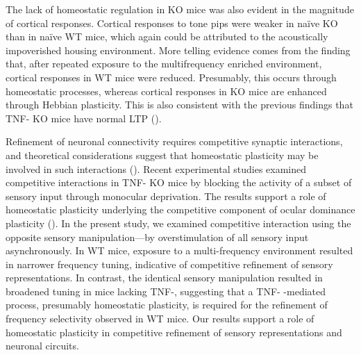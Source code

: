 The lack of homeostatic regulation in KO mice was also evident in the magnitude of cortical responses. Cortical responses to tone pips were weaker in na\"ive KO than in na\"ive WT mice, which again could be attributed to the acoustically impoverished housing environment. More telling evidence comes from the finding that, after repeated exposure to the multifrequency enriched environment, cortical responses in WT mice were reduced. Presumably, this occurs through homeostatic processes, whereas cortical responses in KO mice are enhanced through Hebbian plasticity. This is also consistent with the previous findings that TNF-\textalpha{} KO mice have normal LTP (\cite{Albensi2000, Stellwagen2006, Kaneko2008}).

Refinement of neuronal connectivity requires competitive synaptic interactions, and theoretical considerations suggest that homeostatic plasticity may be involved in such interactions (\cite{Davis2001, Burrone2003, Turrigiano2004}). Recent experimental studies examined competitive interactions in TNF-\textalpha{} KO mice by blocking the activity of a subset of sensory input through monocular deprivation. The results support a role of homeostatic plasticity underlying the competitive component of ocular dominance plasticity (\cite{Kaneko2008, Ranson2012}). In the present study, we examined competitive interaction using the opposite sensory manipulation---by overstimulation of all sensory input asynchronously. In WT mice, exposure to a multi-frequency environment resulted in narrower frequency tuning, indicative of competitive refinement of sensory representations. In contrast, the identical sensory manipulation resulted in broadened tuning in mice lacking TNF-\textalpha{}, suggesting that a TNF-\textalpha{} -mediated process, presumably homeostatic plasticity, is required for the refinement of frequency selectivity observed in WT mice. Our results support a role of homeostatic plasticity in competitive refinement of sensory representations and neuronal circuits.

